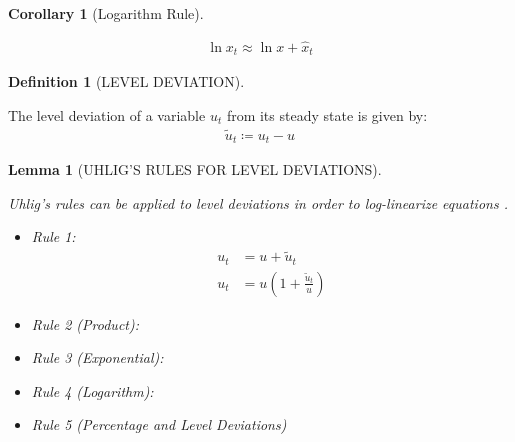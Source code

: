 \documentclass[
	12pt,
	]{article}
\numberwithin{equation}{section}
\theoremstyle{definition}
\newtheorem{definition}{Definition}[section]
\theoremstyle{plain}
\theoremstyle{plain}
\newtheorem{lemma}{Lemma}[section]
\theoremstyle{plain}
\newtheorem{corollary}{Corollary}[lemma]
\begin{document}
\begin{corollary}[Logarithm Rule]\label{coro:logarithm-rule}

\begin{align*}
	\ln x_t \approx \ln x + \hat{x}_t
\end{align*}
	
\end{corollary}


\begin{definition}[LEVEL DEVIATION]\label{def:level-deviation}
	
	The level deviation of a variable $u_t$ from its steady state is given by: \cite[Lecture 9, p.9]{solis-garcia_ucb_2022}
	\begin{align}
		\widetilde{u}_t \coloneq u_t - u \label{eq:level-deviation}
	\end{align}
	
\end{definition}


\begin{lemma}[UHLIG'S RULES FOR LEVEL DEVIATIONS]\label{lemma:level-rules}
	
	Uhlig's rules can be applied to level deviations in order to log-linearize equations \cite[Lecture 6, p.2]{solis-garcia_ucb_2022}.
	
	\begin{itemize}
		\item Rule 1:
		\begin{align}
		\label{lemma:level-rule-1a}
			u_t &= u + \widetilde{u}_t \\
		\label{lemma:level-rule-1b}
			u_t &= u\left(1+ \frac{\widetilde{u}_t}{u} \right)
		\end{align}
				
		\item Rule 2 (Product):
		
		\item Rule 3 (Exponential):
		
		\item Rule 4 (Logarithm):
		
		\item Rule 5 (Percentage and Level Deviations)
		
	\end{itemize}
	
\end{lemma}
\end{document}
